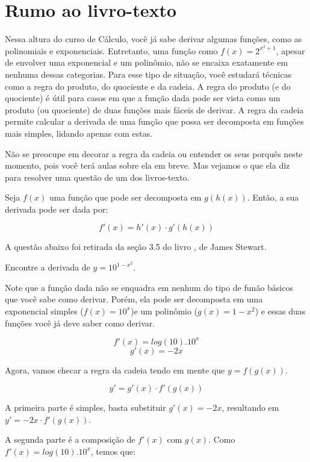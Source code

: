 \documentclass[main_estudante.tex]{subfiles}
\begin{document}
\newpage

\section{Rumo ao livro-texto}

Nessa altura do curso de Cálculo, você já sabe derivar algumas funções, como as polinomiais e exponenciais.  Entretanto, uma função como $f(x)=2^{x^3+1}$, apesar de envolver uma exponencial e um polinômio, não se encaixa exatamente em nenhuma dessas categorias. Para esse tipo de situação, você estudará técnicas como a regra do produto, do quociente e da cadeia. A regra do produto (e do quociente) é útil para casos em que a função dada pode ser vista como um produto (ou quociente) de duas funções mais fáceis de derivar. A regra da cadeia permite calcular a derivada de uma função que possa ser decomposta em funções mais simples, lidando apenas com estas.

Não se preocupe em decorar a regra da cadeia ou entender os seus porquês neste momento, pois você terá aulas sobre ela em breve. Mas vejamos o que ela diz para resolver uma questão de um dos livros-texto.

\begin{shaded*}
Seja $f(x)$ uma função que pode ser decomposta em $g(h(x))$. Então, a sua derivada pode ser dada por:

$$f'(x) = h'(x) \cdot g'(h(x)) $$
\end{shaded*}

A questão abaixo foi retirada da seção 3.5 do livro , de James Stewart.

\begin{resolvida}
Encontre a derivada de $y=10^{1-x^2}$.
\end{resolvida}

Note que a função dada não se enquadra em nenhum do tipo de funão básicos que você sabe como derivar. Porém, ela pode ser decomposta em uma exponencial simples ($f(x)=10^x$)e um polinômio ($g(x)=1-x^2$) e essas duas funções você já deve saber como derivar.

$$f'(x)=log(10) . 10^x $$
$$g'(x)=-2x $$

Agora, vamos checar a regra da cadeia tendo em mente que $y=f(g(x))$.

$$y' = g'(x) \cdot f'(g(x))$$

A primeira parte é simples, basta substituir $g'(x)=-2x$, resultando em $y' = -2x \cdot f'(g(x))$.

A segunda parte é a composição de $f'(x)$ com $g(x)$. Como $f'(x)=log(10) . 10^x$, temos que:
\end{document}
